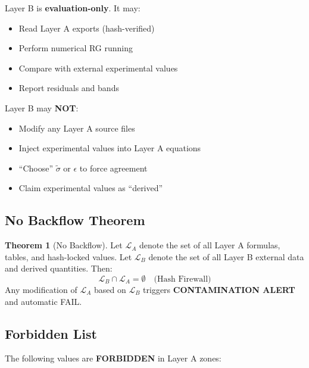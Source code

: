 \documentclass[11pt,a4paper]{article}
\theoremstyle{definition}
\newtheorem{theorem}{Theorem}[section]
\begin{document}
\begin{layerbbox}
Layer B is \textbf{evaluation-only}. It may:
\begin{itemize}
  \item Read Layer A exports (hash-verified)
  \item Perform numerical RG running
  \item Compare with external experimental values
  \item Report residuals and bands
\end{itemize}

Layer B may \textbf{NOT}:
\begin{itemize}
  \item Modify any Layer A source files
  \item Inject experimental values into Layer A equations
  \item ``Choose'' $\tilde{\sigma}$ or $\epsilon$ to force agreement
  \item Claim experimental values as ``derived''
\end{itemize}
\end{layerbbox}

\subsection{No Backflow Theorem}
\label{subsec:no-backflow}

\begin{firewallbox}
\begin{theorem}[No Backflow]
\label{thm:no-backflow}
Let $\mathcal{L}_A$ denote the set of all Layer A formulas, tables, and hash-locked
values. Let $\mathcal{L}_B$ denote the set of all Layer B external data and
derived quantities. Then:
\begin{equation}
\label{eq:no-backflow}
\boxed{\mathcal{L}_B \cap \mathcal{L}_A = \emptyset \quad \text{(Hash Firewall)}}
\end{equation}
Any modification of $\mathcal{L}_A$ based on $\mathcal{L}_B$ triggers
\textbf{CONTAMINATION ALERT} and automatic FAIL.
\end{theorem}
\end{firewallbox}

\subsection{Forbidden List}
\label{subsec:forbidden-list}

The following values are \textbf{FORBIDDEN} in Layer A zones:
\end{document}
